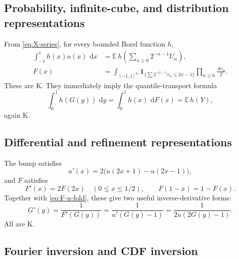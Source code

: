 \documentclass[11pt,oneside]{article}
\numberwithin{equation}{section}
\theoremstyle{definition}
\theoremstyle{remark}
\newcommand{\N}{\mathbb N}
\newcommand{\E}{\mathbb E}
\newcommand{\dd}{\,\mathrm d}
\newcommand{\statusknown}{\textcolor{deepviolet}{\textsf{K}}}
\begin{document}
\subsection{Probability, infinite-cube, and distribution representations}

From \eqref{eq:X-series}, for every bounded Borel function $h$,
\begin{align}
 \int_{-1}^{1}h(x)u(x)\,\dd x
 &=\E\,h\!\left(\sum_{n\ge0}2^{-n-1}U_n\right),             \label{eq:prob-test}\\
 F(x)
 &=\int_{[-1,1]^{\N}}\mathbf1_{\{\sum 2^{-n-1}v_n\le2x-1\}}
       \prod_{n\ge0}\frac{\dd v_n}{2}.                   \label{eq:infinite-cube-F}
\end{align}
These are \statusknown.  They immediately imply the quantile-transport formula
\begin{equation}
 \int_0^1 h(G(y))\,\dd y
 =\int_0^1 h(x)\,\dd F(x)
 =\E\,h(Y),                                                \label{eq:quantile-transport}
\end{equation}
again \statusknown.

\subsection{Differential and refinement representations}

The bump satisfies
\begin{equation}
 u'(x)=2\bigl(u(2x+1)-u(2x-1)\bigr),                        \label{eq:u-DDE}
\end{equation}
and $F$ satisfies
\begin{equation}
 F'(x)=2F(2x)\quad(0\le x\le1/2),
 \qquad F(1-x)=1-F(x).                                     \label{eq:F-DDE}
\end{equation}
Together with \eqref{eq:F-u-fold}, these give two useful inverse-derivative
forms:
\begin{equation}
 G'(y)=\frac1{F'(G(y))}
 =\frac1{u'(G(y)-1)}
 =\frac1{2u(2G(y)-1)}.                                     \label{eq:G-prime}
\end{equation}
All are \statusknown.

\subsection{Fourier inversion and CDF inversion}
\end{document}

